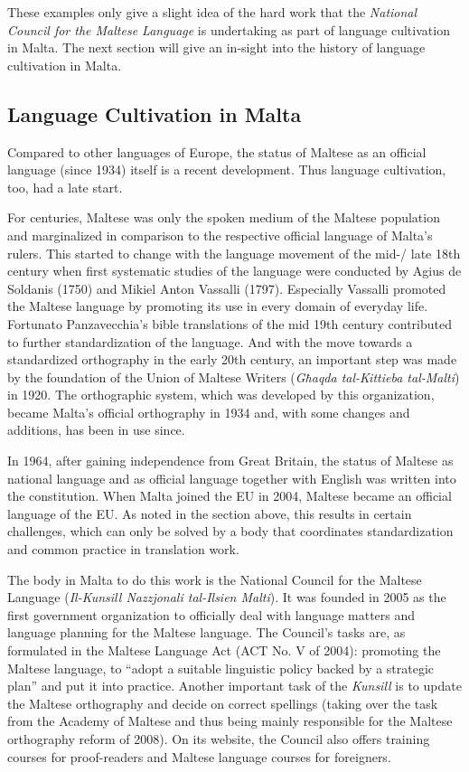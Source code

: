 \documentclass[]{../../metanetpaper}
\begin{document}
\begin{multicols}{2}
These examples only give a slight idea of the hard work that the \emph{National Council for the Maltese Language} is undertaking as part of language cultivation in Malta. The next section will give an in-sight into the history of language cultivation in Malta.

\subsection{Language Cultivation in Malta}

Compared to other languages of Europe, the status of Maltese as an official language (since 1934) itself is a recent development. Thus language cultivation, too, had a late start. 

For centuries, Maltese was only the spoken medium of the Maltese population and marginalized in comparison to the respective official language of Malta's rulers. This started to change with the language movement of the mid-/ late 18th century when first systematic studies of the language were conducted by Agius de Soldanis (1750) and Mikiel Anton Vassalli (1797). Especially Vassalli promoted the Maltese language by promoting its use in every domain of everyday life. Fortunato Panzavecchia's bible translations of the mid 19th century contributed to further standardization of the language. And with the move towards a standardized orthography in the early 20th century, an important step was made by the foundation of the Union of Maltese Writers (\emph{Għaqda tal-Kittieba tal-Malti}) in 1920. The orthographic system, which was developed by this organization, became Malta's official orthography in 1934 and, with some changes and additions, has been in use since.

In 1964, after gaining independence from Great Britain, the status of Maltese as national language and as official language together with English was written into the constitution. When Malta joined the EU in 2004, Maltese became an official language of the EU. As noted in the section above, this results in certain challenges, which can only be solved by a body that coordinates standardization and common practice in translation work.

The body in Malta to do this work is the National Council for the Maltese Language (\emph{Il-Kunsill Nazzjonali tal-Ilsien Malti}). It was founded in 2005 as the first government organization to officially deal with language matters and language planning for the Maltese language. The Council's tasks are, as formulated in the Maltese Language Act (ACT No. V of 2004): promoting the Maltese language, to ``adopt a suitable linguistic policy backed by a strategic plan'' and put it into practice. Another important task of the \emph{Kunsill} is to update the Maltese orthography and decide on correct spellings (taking over the task from the Academy of Maltese and thus being mainly responsible for the Maltese orthography reform of 2008). On its website, the Council also offers training courses for proof-readers and Maltese language courses for foreigners\cite{Kunsill1}. 


\end{multicols}
\end{document}
